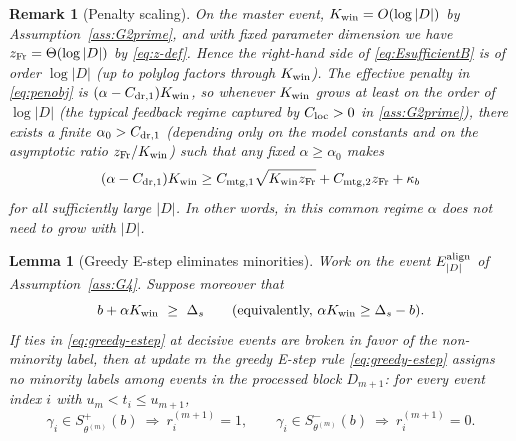\documentclass{statsoc}
\newtheorem{lemma}[lemma]{Lemma}
\newtheorem{remark}[remark]{Remark}
\newcommand{\1}{\mathbbm{1}}
\begin{document}
\begin{remark}[Penalty scaling]\label{rem:alpha-scaling}
On the master event, $K_{\rm win}=O(\log|D|)$ by Assumption~\ref{ass:G2prime}, and with fixed parameter dimension we have $z_{\rm Fr}=\Theta(\log|D|)$ by \eqref{eq:z-def}. Hence the right-hand side of \eqref{eq:EsufficientB} is of order $\log|D|$ (up to polylog factors through $K_{\rm win}$). The effective penalty in \eqref{eq:penobj} is $(\alpha-C_{\rm dr,1})K_{\rm win}$, so whenever $K_{\rm win}$ grows at least on the order of $\log|D|$ (the typical feedback regime captured by $C_{\rm loc}>0$ in \cref{ass:G2prime}), there exists a finite $\alpha_0>C_{\rm dr,1}$ (depending only on the model constants and on the asymptotic ratio $z_{\rm Fr}/K_{\rm win}$) such that any fixed $\alpha\ge\alpha_0$ makes
\[
(\alpha-C_{\rm dr,1})K_{\rm win}
\ge C_{\rm mtg,1}\sqrt{K_{\rm win} z_{\rm Fr}}+C_{\rm mtg,2}z_{\rm Fr}+\kappa_b
\]
for all sufficiently large $|D|$. In other words, in this common regime $\alpha$ does not need to grow with $|D|$.
\end{remark}

\begin{lemma}[Greedy E-step eliminates minorities]\label{lem:E-elim}
Work on the event \(E^{\rm align}_{|D|}\) of Assumption~\ref{ass:G4}. Suppose moreover that
\begin{equation}\label{eq:Eelim-cond}
b+\alpha K_{\rm win}\ \ge\ \Delta_s
\qquad\text{(equivalently, }\alpha K_{\rm win}\ge \Delta_s-b\text{)}.
\end{equation}
If ties in \eqref{eq:greedy-estep} at decisive events are broken in favor of the non-minority label, then at update $m$ the greedy E-step rule \eqref{eq:greedy-estep} assigns no minority labels among events in the processed block $D_{m+1}$:
for every event index $i$ with $u_m<t_i\le u_{m+1}$,
\[
\gamma_i\in S_{\theta^{(m)}}^+(b)\ \Rightarrow\ r_i^{(m+1)}=1,
\qquad
\gamma_i\in S_{\theta^{(m)}}^-(b)\ \Rightarrow\ r_i^{(m+1)}=0.
\]
\end{lemma}
\end{document}
